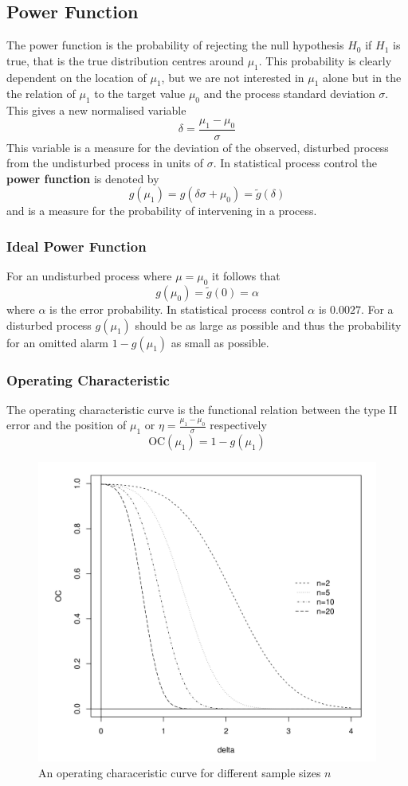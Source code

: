 \documentclass[11pt]{article}
\theoremstyle{definition}
\begin{document}
\subsection{Power Function}
The power function is the probability of rejecting the null hypothesis $H_0$ if $H_1$ is true, that is the true distribution centres around $\mu_1$. This probability is clearly dependent on the location of $\mu_1$, but we are not interested in $\mu_1$ alone but in the the relation of $\mu_1$ to the target value $\mu_0$ and the process standard deviation $\sigma$. This gives a new normalised variable
\begin{equation*}
	\delta = \frac{\mu_1 - \mu_0}{\sigma}
\end{equation*}
This variable is a measure for the deviation of the observed, disturbed process from the undisturbed process in units of $\sigma$. In statistical process control the \textbf{power function} is denoted by
\begin{equation*}
	g(\mu_1) = g(\delta\sigma + \mu_0) = \tilde{g}(\delta)
\end{equation*}
and is a measure for the probability of intervening in a process.

\subsubsection{Ideal Power Function}
For an undisturbed process where $\mu = \mu_0$ it follows that
\begin{equation*}
	g(\mu_0) = \tilde{g}(0) = \alpha
\end{equation*}
where $\alpha$ is the error probability. In statistical process control $\alpha$ is $0.0027$. For a disturbed process $g(\mu_1)$ should be as large as possible and thus the probability for an omitted alarm $1-g(\mu_1)$ as small as possible. 

\subsubsection{Operating Characteristic}
The operating characteristic curve is the functional relation between the type II error and the position of $\mu_1$ or $\eta = \frac{\mu_1 - \mu_0}{\sigma}$ respectively
\begin{equation*}
	\text{OC}(\mu_1) = 1 - g(\mu_1)
\end{equation*}

\begin{figure}[H]
	\centering
	\includegraphics[width=0.4\linewidth]{img/OC_curve}
	\caption{An operating characeristic curve for different sample sizes $n$}
	\label{fig:occurve}
\end{figure}
\end{document}
